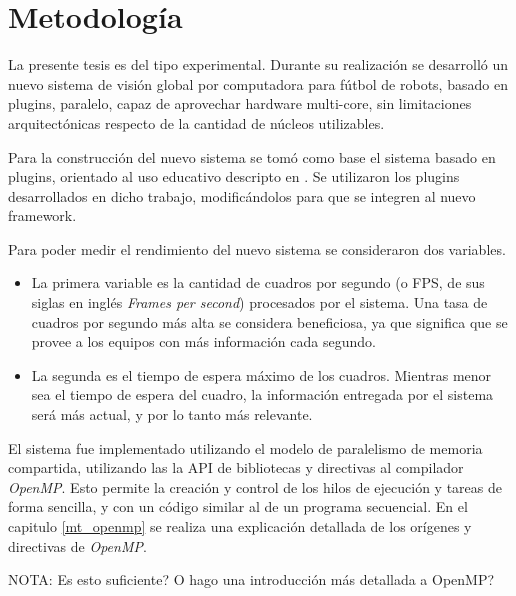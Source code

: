 
\section{Metodología}

\label{metodologia}

La presente tesis es del tipo experimental. Durante su realización se desarrolló
un nuevo sistema de visión global por computadora para fútbol de robots, basado
en plugins, paralelo, capaz de aprovechar hardware multi-core, sin limitaciones
arquitectónicas respecto de la cantidad de núcleos utilizables.

Para la construcción del nuevo sistema se tomó como base el sistema basado en
plugins, orientado al uso educativo descripto en \cite{torres2014}. Se
utilizaron los plugins desarrollados en dicho trabajo, modificándolos para que
se integren al nuevo framework.

Para poder medir el rendimiento del nuevo sistema se consideraron dos variables.

\begin {itemize}

	\item	La primera variable es la cantidad de cuadros por segundo (o
		FPS, de sus siglas en inglés \emph{Frames per second})
		procesados por el sistema. Una tasa de cuadros por segundo más
		alta se considera beneficiosa, ya que significa que se provee a
		los equipos con más información cada segundo.

	\item	La segunda es el tiempo de espera máximo de los cuadros.
		Mientras menor sea el tiempo de espera del cuadro, la
		información entregada por el sistema será más actual, y por lo
		tanto más relevante.

\end {itemize}

El sistema fue implementado utilizando el modelo de paralelismo de memoria
compartida, utilizando las la API de bibliotecas y directivas al compilador
\emph{OpenMP}. Esto permite la creación y control de los hilos de ejecución
y tareas de forma sencilla, y con un código similar al de un programa
secuencial. En el capitulo \ref{mt_openmp} se realiza una explicación detallada
de los orígenes y directivas de \emph{OpenMP}.

NOTA: Es esto suficiente? O hago una introducción más detallada a OpenMP?
